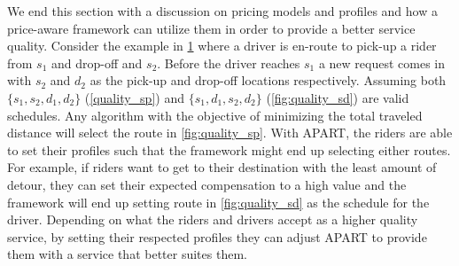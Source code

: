 We end this section with a discussion on pricing models and profiles and how a price-aware framework can utilize them in order to provide a better service quality. Consider the example in \cref{fig:quality_eg} where a driver is en-route to pick-up a rider from $s_1$ and drop-off and $s_2$. Before the driver reaches $s_1$ a new request comes in with $s_2$ and $d_2$ as the pick-up and drop-off locations respectively. Assuming both $\lbrace s_1, s_2, d_1, d_2 \rbrace$ (\cref{quality_sp}) and $\lbrace s_1, d_1, s_2, d_2 \rbrace$ (\cref{fig:quality_sd}) are valid schedules. Any algorithm with the objective of minimizing the total traveled distance will select the route in \cref{fig:quality_sp}. With APART, the riders are able to set their profiles such that the framework might end up selecting either routes. For example, if riders want to get to their destination with the least amount of detour, they can set their expected compensation to a high value and the framework will end up setting route in \cref{fig:quality_sd} as the schedule for the driver. Depending on what the riders and drivers accept as a higher quality service, by setting their respected profiles they can adjust APART to provide them with a service that better suites them.

\begin{figure}[!ht]
	\centering
	\vspace{-0mm}\caption{} \vspace{-2mm} \label{fig:quality_eg}
\end{figure}\vspace{-0mm}


